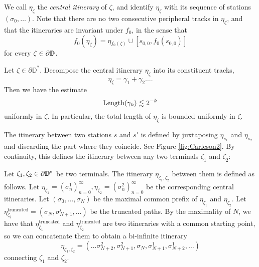 We call $\eta_{\zeta}$ the \emph{central itinerary} of $\zeta$, and identify $\eta_{\zeta}$ with its sequence of stations $(\sigma_0,\ldots)$.
Note that there are no two consecutive peripheral tracks in $\eta_{\zeta}$, and that the itineraries are invariant under $f_{0}$, in the sense that
\begin{equation*}
f_{0}(\eta_{\zeta})=\eta{}_{f_{0}(\zeta)}\cup[s_{0,0},f_0(s_{0,0})]
\end{equation*}
for every $\zeta\in\partial\mathbb{D}$.

\begin{lemma}
Let $\zeta\in \partial \mathbb D^*$. Decompose the central itinerary $\eta_{\zeta}$ into its constituent tracks, 
$$\eta_{\zeta}=\gamma _1 + \gamma_2\ldots .$$ 
	Then we have the estimate $$\operatorname{Length}(\gamma_{k})\lesssim2^{-k}$$ uniformly in $\zeta$. 
In particular, the total length of $\eta_\zeta$ is bounded uniformly in $\zeta$.
\end{lemma}



The itinerary between two stations $s$ and $s'$ is defined by juxtaposing $\eta_{s_1}$ and $\eta_{s_2}$ and discarding the part where they coincide. See Figure \ref{fig:Carleson2}. 
By continuity, this defines the itinerary between any two terminals $\zeta_1$ and $\zeta_2$:

\begin{definition}
	Let $\zeta_{1},\zeta_{2}\in\partial\mathbb{D}^*$ be two terminals. The itinerary $\eta_{\zeta_{1},\zeta_{2}}$ between them is defined as follows.
	Let $\eta_{\zeta_{1}}=\left(\sigma_{n}^{1}\right)_{n=0}^{\infty},\eta_{\zeta_{2}}=\left(\sigma_{n}^{2}\right)_{n=0}^{\infty}$
	be the corresponding central itineraries.	
	Let $\left(\sigma_{0},\ldots,\sigma_{N}\right)$ be the maximal common
	prefix of $\eta_{\zeta_{1}}$ and $\eta_{\zeta_{2}}$. Let $\eta_{\zeta_{i}}^{\text{truncated}}=\left(\sigma_{N},\sigma_{N+1}^{i},\ldots\right)$
	be the truncated paths. By the maximality of $N$, we have that $\eta_{\zeta_{1}}^{\text{truncated}}$
	and $\eta_{\zeta_{2}}^{\text{truncated}}$ are two itineraries with a common
	starting point, so we can concatenate them to obtain a bi-infinite itinerary 
	\[
	\eta_{\zeta_{1},\zeta_{2}}=\left(\ldots\sigma_{N+2}^{2},\sigma_{N+1}^{2},\sigma_{N},\sigma_{N+1}^{1},\sigma_{N+2}^{1},\ldots\right)
	\]
	connecting $\zeta_{1}$ and $\zeta_{2}$.
	
	
\end{definition}

